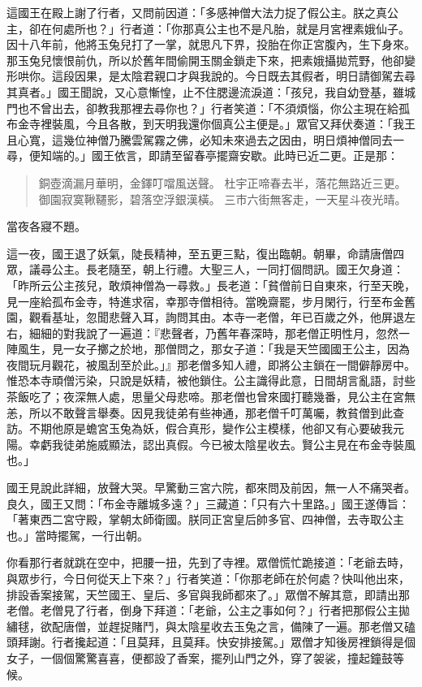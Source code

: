 這國王在殿上謝了行者，又問前因道：「多感神僧大法力捉了假公主。朕之真公主，卻在何處所也？」行者道：「你那真公主也不是凡胎，就是月宮裡素娥仙子。因十八年前，他將玉兔兒打了一掌，就思凡下界，投胎在你正宮腹內，生下身來。那玉兔兒懷恨前仇，所以於舊年間偷開玉關金鎖走下來，把素娥攝拋荒野，他卻變形哄你。這段因果，是太陰君親口才與我說的。今日既去其假者，明日請御駕去尋其真者。」國王聞說，又心意慚惶，止不住腮邊流淚道：「孩兒，我自幼登基，雖城門也不曾出去，卻教我那裡去尋你也？」行者笑道：「不須煩惱，你公主現在給孤布金寺裡裝風，今且各散，到天明我還你個真公主便是。」眾官又拜伏奏道：「我王且心寬，這幾位神僧乃騰雲駕霧之佛，必知未來過去之因由，明日煩神僧同去一尋，便知端的。」國王依言，即請至留春亭擺齋安歇。此時已近二更。正是那：
\begin{quote}
銅壺滴漏月華明，金鐸叮噹風送聲。
杜宇正啼春去半，落花無路近三更。
御園寂寞鞦韆影，碧落空浮銀漢橫。
三市六街無客走，一天星斗夜光晴。
\end{quote}

當夜各寢不題。

這一夜，國王退了妖氣，陡長精神，至五更三點，復出臨朝。朝畢，命請唐僧四眾，議尋公主。長老隨至，朝上行禮。大聖三人，一同打個問訊。國王欠身道：「昨所云公主孩兒，敢煩神僧為一尋救。」長老道：「貧僧前日自東來，行至天晚，見一座給孤布金寺，特進求宿，幸那寺僧相待。當晚齋罷，步月閑行，行至布金舊園，觀看基址，忽聞悲聲入耳，詢問其由。本寺一老僧，年已百歲之外，他屏退左右，細細的對我說了一遍道：『悲聲者，乃舊年春深時，那老僧正明性月，忽然一陣風生，見一女子擲之於地，那僧問之，那女子道：「我是天竺國國王公主，因為夜間玩月觀花，被風刮至於此。」』那老僧多知人禮，即將公主鎖在一間僻靜房中。惟恐本寺頑僧污染，只說是妖精，被他鎖住。公主識得此意，日間胡言亂語，討些茶飯吃了；夜深無人處，思量父母悲啼。那老僧也曾來國打聽幾番，見公主在宮無恙，所以不敢聲言舉奏。因見我徒弟有些神通，那老僧千叮萬囑，教貧僧到此查訪。不期他原是蟾宮玉兔為妖，假合真形，變作公主模樣，他卻又有心要破我元陽。幸虧我徒弟施威顯法，認出真假。今已被太陰星收去。賢公主見在布金寺裝風也。」

國王見說此詳細，放聲大哭。早驚動三宮六院，都來問及前因，無一人不痛哭者。良久，國王又問：「布金寺離城多遠？」三藏道：「只有六十里路。」國王遂傳旨：「著東西二宮守殿，掌朝太師衛國。朕同正宮皇后帥多官、四神僧，去寺取公主也。」當時擺駕，一行出朝。

你看那行者就跳在空中，把腰一扭，先到了寺裡。眾僧慌忙跪接道：「老爺去時，與眾步行，今日何從天上下來？」行者笑道：「你那老師在於何處？快叫他出來，排設香案接駕，天竺國王、皇后、多官與我師都來了。」眾僧不解其意，即請出那老僧。老僧見了行者，倒身下拜道：「老爺，公主之事如何？」行者把那假公主拋繡毬，欲配唐僧，並趕捉賭鬥，與太陰星收去玉兔之言，備陳了一遍。那老僧又磕頭拜謝。行者攙起道：「且莫拜，且莫拜。快安排接駕。」眾僧才知後房裡鎖得是個女子，一個個驚驚喜喜，便都設了香案，擺列山門之外，穿了袈裟，撞起鐘鼓等候。

